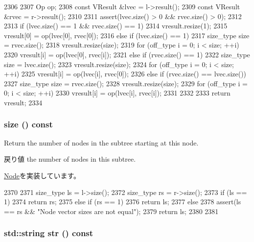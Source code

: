 \begin{DoxyCode}
2306     {
2307         Op op;
2308         const VResult &lvec = l->result();
2309         const VResult &rvec = r->result();
2310 
2311         assert(lvec.size() > 0 && rvec.size() > 0);
2312 
2313         if (lvec.size() == 1 && rvec.size() == 1) {
2314             vresult.resize(1);
2315             vresult[0] = op(lvec[0], rvec[0]);
2316         } else if (lvec.size() == 1) {
2317             size_type size = rvec.size();
2318             vresult.resize(size);
2319             for (off_type i = 0; i < size; ++i)
2320                 vresult[i] = op(lvec[0], rvec[i]);
2321         } else if (rvec.size() == 1) {
2322             size_type size = lvec.size();
2323             vresult.resize(size);
2324             for (off_type i = 0; i < size; ++i)
2325                 vresult[i] = op(lvec[i], rvec[0]);
2326         } else if (rvec.size() == lvec.size()) {
2327             size_type size = rvec.size();
2328             vresult.resize(size);
2329             for (off_type i = 0; i < size; ++i)
2330                 vresult[i] = op(lvec[i], rvec[i]);
2331         }
2332 
2333         return vresult;
2334     }
\end{DoxyCode}
\hypertarget{classStats_1_1BinaryNode_a503ab01f6c0142145d3434f6924714e7}{
\subsubsection[{size}]{ size () const}}
\label{classStats_1_1BinaryNode_a503ab01f6c0142145d3434f6924714e7}
Return the number of nodes in the subtree starting at this node. \begin{DoxyReturn}{戻り値}
the number of nodes in this subtree. 
\end{DoxyReturn}


\hyperlink{classStats_1_1Node_a4051d143efd31726fa13df03ae4e1bce}{Node}を実装しています。


\begin{DoxyCode}
2370     {
2371         size_type ls = l->size();
2372         size_type rs = r->size();
2373         if (ls == 1) {
2374             return rs;
2375         } else if (rs == 1) {
2376             return ls;
2377         } else {
2378             assert(ls == rs && "Node vector sizes are not equal");
2379             return ls;
2380         }
2381     }
\end{DoxyCode}
\hypertarget{classStats_1_1BinaryNode_a1b9b8885b0880fc4ddf9a2c7d1ca3dc4}{
\subsubsection[{str}]{\setlength{\rightskip}{0pt plus 5cm}std::string str () const}}
\label{classStats_1_1BinaryNode_a1b9b8885b0880fc4ddf9a2c7d1ca3dc4}


